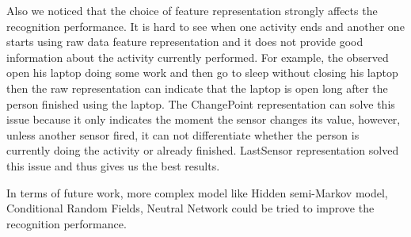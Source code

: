 \documentclass[10pt,letter]{article}
\numberwithin{equation}{section} %
\numberwithin{figure}{section} %
\numberwithin{table}{section} %
\begin{document}
Also we noticed that the choice of feature representation strongly affects the recognition performance. It is hard to see when one activity ends and another one starts using raw data feature representation and it does not provide good information about the activity currently performed. For example, the observed open his laptop doing some work and then go to sleep without closing his laptop then the raw representation can indicate that the laptop is open long after the person finished using the laptop. The ChangePoint representation can solve this issue because it only indicates the moment the sensor changes its value, however, unless another sensor fired, it can not differentiate whether the person is currently doing the activity or already finished. LastSensor representation solved this issue and thus gives us the best results.  

In terms of future work, more complex model like Hidden semi-Markov model, Conditional Random Fields, Neutral Network could be tried to improve the recognition performance. 
\end{document}
